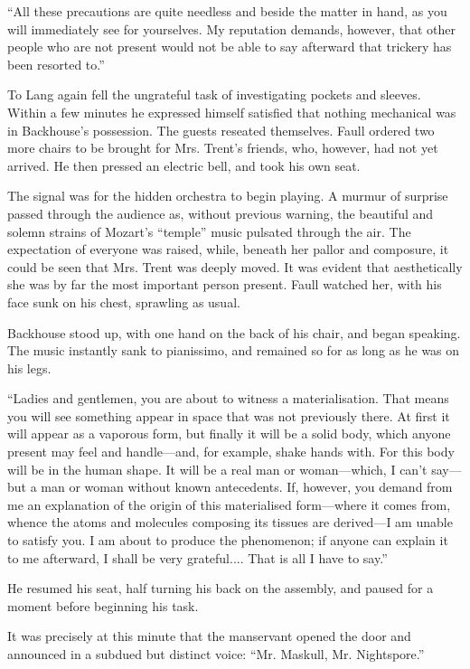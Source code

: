 ``All these precautions are quite needless and beside the matter in hand, as you will immediately see for yourselves. My reputation demands, however, that other people who are not present would not be able to say afterward that trickery has been resorted to.''

To Lang again fell the ungrateful task of investigating pockets and sleeves. Within a few minutes he expressed himself satisfied that nothing mechanical was in Backhouse's possession. The guests reseated themselves. Faull ordered two more chairs to be brought for Mrs. Trent's friends, who, however, had not yet arrived. He then pressed an electric bell, and took his own seat.

The signal was for the hidden orchestra to begin playing. A murmur of surprise passed through the audience as, without previous warning, the beautiful and solemn strains of Mozart's ``temple'' music pulsated through the air. The expectation of everyone was raised, while, beneath her pallor and composure, it could be seen that Mrs. Trent was deeply moved. It was evident that aesthetically she was by far the most important person present. Faull watched her, with his face sunk on his chest, sprawling as usual.

Backhouse stood up, with one hand on the back of his chair, and began speaking. The music instantly sank to pianissimo, and remained so for as long as he was on his legs.

``Ladies and gentlemen, you are about to witness a materialisation. That means you will see something appear in space that was not previously there. At first it will appear as a vaporous form, but finally it will be a solid body, which anyone present may feel and handle—and, for example, shake hands with. For this body will be in the human shape. It will be a real man or woman—which, I can't say—but a man or woman without known antecedents. If, however, you demand from me an explanation of the origin of this materialised form—where it comes from, whence the atoms and molecules composing its tissues are derived—I am unable to satisfy you. I am about to produce the phenomenon; if anyone can explain it to me afterward, I shall be very grateful.... That is all I have to say.''

He resumed his seat, half turning his back on the assembly, and paused for a moment before beginning his task.

It was precisely at this minute that the manservant opened the door and announced in a subdued but distinct voice: ``Mr. Maskull, Mr. Nightspore.''

